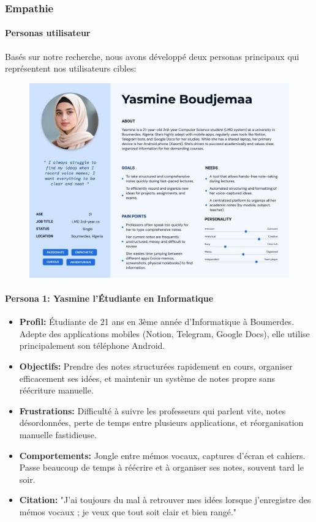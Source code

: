     \subsubsection{Empathie}
    
    \paragraph{Personas utilisateur}
    
    Basés sur notre recherche, nous avons développé deux personas principaux qui représentent nos utilisateurs cibles:
    
    \begin{figure}[H]
        \centering
        \includegraphics[width=\textwidth]{assets/docs/yassmine-personaa.jpg}
    \end{figure}
    
    \paragraph{Persona 1: Yasmine l'Étudiante en Informatique}
    
    
    \begin{itemize}
        \item \textbf{Profil:} Étudiante de 21 ans en 3ème année d'Informatique à Boumerdes. Adepte des applications mobiles (Notion, Telegram, Google Docs), elle utilise principalement son téléphone Android.
        \item \textbf{Objectifs:} Prendre des notes structurées rapidement en cours, organiser efficacement ses idées, et maintenir un système de notes propre sans réécriture manuelle.
        \item \textbf{Frustrations:} Difficulté à suivre les professeurs qui parlent vite, notes désordonnées, perte de temps entre plusieurs applications, et réorganisation manuelle fastidieuse.
        \item \textbf{Comportements:} Jongle entre mémos vocaux, captures d'écran et cahiers. Passe beaucoup de temps à réécrire et à organiser ses notes, souvent tard le soir.
        \item \textbf{Citation:} "J'ai toujours du mal à retrouver mes idées lorsque j'enregistre des mémos vocaux ; je veux que tout soit clair et bien rangé."
    \end{itemize}

